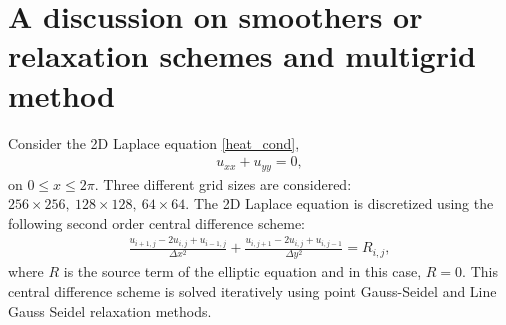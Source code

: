 \documentclass[11pt]{report}
\begin{document}
\section{A discussion on smoothers or relaxation schemes and multigrid method}
Consider the 2D Laplace equation \eqref{heat_cond},
\begin{align*}
u_{xx}+u_{yy}=0, 
\end{align*}
on $0\leq x \leq 2\pi$. Three different grid sizes 
are considered: $256\times256, \ 128\times128, \ 
64\times64$. The 2D Laplace equation is 
discretized using the following second order central difference scheme:
\begin{align}
\frac{u_{i+1,j}-2u_{i,j}+u_{i-1,j}}{\Delta x^2}+\frac{u_{i,j+1}-2u_{i,j}+u_{i,j-1}}{\Delta y^2}=R_{i,j}, \label{heat_cond_discret}
\end{align}
where $R$ is the source term of the elliptic equation and in this case, $R=0$.
This central difference scheme is solved iteratively using point Gauss-Seidel and Line Gauss Seidel relaxation methods. 
\end{document}
